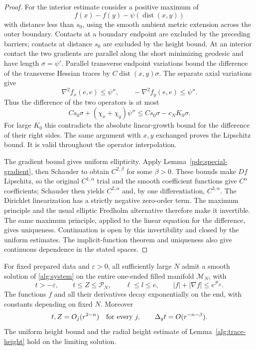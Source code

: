 \begin{proof}
For the interior estimate consider a positive maximum of
\[
 f(x)-f(y)-\psi(\operatorname{dist}(x,y))
\]
with distance less than \(s_0\), using the smooth ambient metric
extension across the outer boundary.  Contacts at a boundary endpoint
are excluded by the preceding barriers; contacts at distance \(s_0\)
are excluded by the height bound.  At an interior contact the two
gradients are parallel along the short minimizing geodesic and have
length \(\sigma=\psi'\).  Parallel transverse endpoint variations
bound the difference of the transverse Hessian traces by
\(C\operatorname{dist}(x,y)\sigma\).  The separate axial variations
give
\[
 \nabla^2f_x(e,e)\le\psi'',\qquad
 -\nabla^2f_y(e,e)\le\psi''.
\]
Thus the difference of the two operators is at most
\[
 C s_0\sigma+(\chi_x+\chi_y)\psi''
 \le C s_0\sigma-c_NK_0\sigma.
\]
For large \(K_0\) this contradicts the absolute linear-growth bound
for the difference of their right sides.  The same argument with
\(x,y\) exchanged proves the Lipschitz bound.  It is valid throughout
the operator interpolation.

The gradient bound gives uniform ellipticity.  Apply
Lemma~\ref{pde:special-gradient}, then Schauder to obtain \(C^{2,\beta}\)
for some \(\beta>0\).  These bounds make \(Df\) Lipschitz, so the
original \(C^{1,\alpha}\) trial and the smooth coefficient functions
give \(C^\alpha\) coefficients; Schauder then yields \(C^{2,\alpha}\)
and, by one differentiation, \(C^{3,\alpha}\).
The Dirichlet linearization has a strictly negative zero-order term.
The maximum principle and the usual elliptic Fredholm alternative
therefore make it invertible.  The same maximum principle, applied
to the linear equation for the difference, gives uniqueness.
Continuation is open by this invertibility and closed by the uniform
estimates.  The implicit-function theorem and uniqueness also give
continuous dependence in the stated spaces.
\end{proof}

\begin{proposition}
\label{pde:filled-solve}
For fixed prepared data and \(\varepsilon>0\), all sufficiently large
\(N\) admit a smooth solution of \eqref{alg:system} on the entire
one-ended filled manifold \(\mathcal M_N\), with
\[
 t>-\varepsilon,\qquad
 t\le Z\le\mathcal P_N,\qquad
 \ell\le l\le e,\qquad
 |f|+|\nabla f|\le e^{\mathcal P_N}.
\]
The functions \(f\) and all their derivatives decay exponentially on
the end, with constants depending on fixed \(N\).  Moreover
\begin{equation}
 t,Z=O_j(r^{2-n})\quad\hbox{for every }j,\qquad
 \Delta_gt=O(r^{-n-\beta}).
 \label{pde:end-decay}
\end{equation}
The uniform height bound and the radial height estimate of
Lemma~\ref{alg:trace-height} hold on the limiting solution.
\end{proposition}

